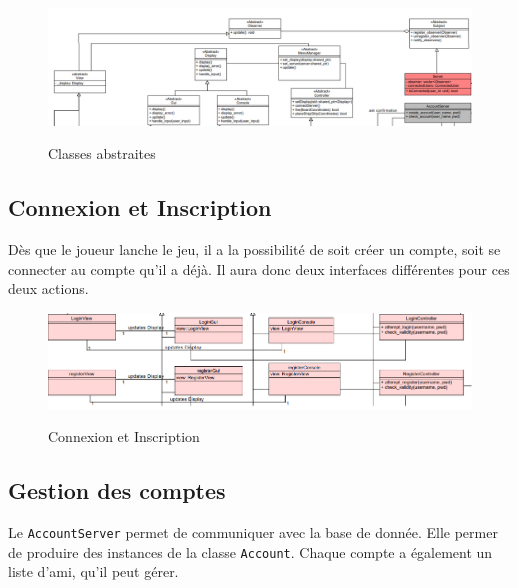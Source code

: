 \documentclass[../design_fonctionnement_sys.tex]{subfiles}
\begin{document}
\begin{figure}[H]
    \centering
    \includegraphics[scale=0.6]{img_design/Abstract.png}
    \label{fig:seq_match_server}
    \caption{Classes abstraites}
\end{figure}

\subsection{Connexion et Inscription}
Dès que le joueur lanche le jeu, il a la possibilité de soit créer un compte, soit se connecter au compte qu'il a déjà. 
Il aura donc deux interfaces différentes pour ces deux actions.
\begin{figure}[H]
    \centering
    \includegraphics[scale=0.6]{img_design/Connexion_et_inscription.png}
    \label{fig:seq_match_server}
    \caption{Connexion et Inscription}
\end{figure}


\subsection{Gestion des comptes}
Le \texttt{AccountServer} permet de communiquer avec la base de donnée. Elle permer de produire des instances de la classe \texttt{Account}. 
Chaque compte a également un liste d'ami, qu'il peut gérer.
\end{document}
